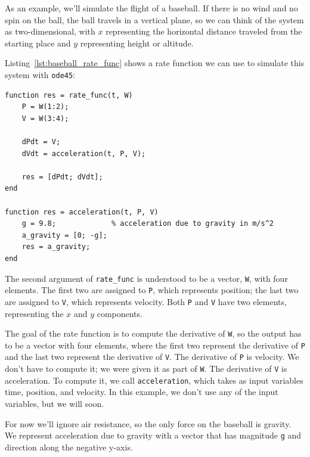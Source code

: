 As an example, we'll simulate the flight of a baseball.
If there is no wind and no spin on the ball, the ball travels in a vertical plane, so we can think of the system as two-dimensional, with $x$ representing the horizontal distance
traveled from the starting place and $y$ representing height or altitude.


Listing~\ref{lst:baseball_rate_func} shows a rate function we can use to simulate this system with \lstinline{ode45}:

\begin{lstlisting}[caption={A rate function we can use to model the flight of a baseball}, label={lst:baseball_rate_func}]
function res = rate_func(t, W)
    P = W(1:2);
    V = W(3:4);

    dPdt = V;
    dVdt = acceleration(t, P, V);

    res = [dPdt; dVdt];
end

function res = acceleration(t, P, V)
    g = 9.8;             % acceleration due to gravity in m/s^2
    a_gravity = [0; -g];
    res = a_gravity;
end
\end{lstlisting}

The second argument of \lstinline{rate_func} is understood to be a vector,
\lstinline{W}, with four elements.  The first two are assigned to \lstinline{P},
which represents position; the last two are assigned to \lstinline{V}, which
represents velocity. Both \lstinline{P} and \lstinline{V} have two elements,
representing the $x$ and $y$ components.


The goal of the rate function is to compute the derivative of \lstinline{W}, so the output has to be a vector with four elements, where the first two represent the derivative of \lstinline{P}  and the last two represent the derivative of \lstinline{V}.
The derivative of \lstinline{P} is velocity.  We don't have to compute it; we were given it as part of \lstinline{W}.
The derivative of \lstinline{V} is acceleration.  To compute it, we call \lstinline{acceleration}, which takes as input variables time, position, and velocity.  In this example, we don't use any of the input variables, but we will soon.


For now we'll ignore air resistance, so the only force on the baseball is gravity.  We represent acceleration due to gravity with a vector that has magnitude \lstinline{g} and direction along the negative y-axis.

